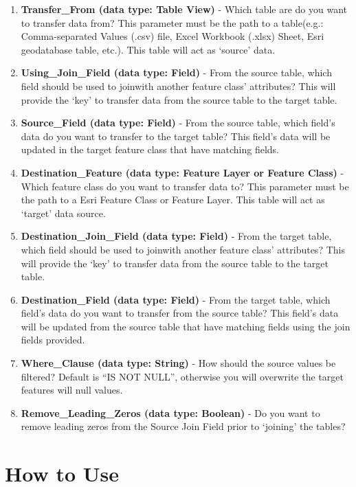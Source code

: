 \documentclass[openany]{book}
\theoremstyle{definition}
\theoremstyle{definition}
\theoremstyle{definition}
\theoremstyle{remark}
\begin{document}
\begin{enumerate}
\def\labelenumi{\arabic{enumi}.}
\item
  \textbf{Transfer\_From (data type: Table View)} - Which table are do
  you want to transfer data from? This parameter must be the path to a
  table(e.g.: Comma-separated Values (.csv) file, Excel Workbook (.xlsx)
  Sheet, Esri geodatabase table, etc.). This table will act as `source'
  data.
\item
  \textbf{Using\_Join\_Field (data type: Field)} - From the source
  table, which field should be used to joinwith another feature class'
  attributes? This will provide the `key' to transfer data from the
  source table to the target table.
\item
  \textbf{Source\_Field (data type: Field)} - From the source table,
  which field's data do you want to transfer to the target table? This
  field's data will be updated in the target feature class that have
  matching fields.
\item
  \textbf{Destination\_Feature (data type: Feature Layer or Feature
  Class)} - Which feature class do you want to transfer data to? This
  parameter must be the path to a Esri Feature Class or Feature Layer.
  This table will act as `target' data source.
\item
  \textbf{Destination\_Join\_Field (data type: Field)} - From the target
  table, which field should be used to joinwith another feature class'
  attributes? This will provide the `key' to transfer data from the
  source table to the target table.
\item
  \textbf{Destination\_Field (data type: Field)} - From the target
  table, which field's data do you want to transfer from the source
  table? This field's data will be updated from the source table that
  have matching fields using the join fields provided.
\item
  \textbf{Where\_Clause (data type: String)} - How should the source
  values be filtered? Default is ``IS NOT NULL'', otherwise you will
  overwrite the target features will null values.
\item
  \textbf{Remove\_Leading\_Zeros (data type: Boolean)} - Do you want to
  remove leading zeros from the Source Join Field prior to `joining' the
  tables?
\end{enumerate}

\section{How to Use}\label{how-to-use}
\end{document}

